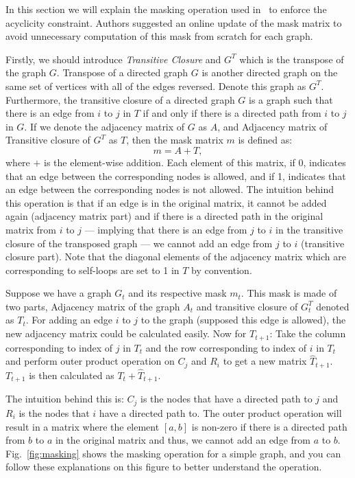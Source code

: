 \documentclass{lxaiproposal}
\begin{document}
    In this section we will explain the masking operation used in~\cite{deleu2022daggflownet} to enforce the acyclicity
    constraint. Authors suggested an online update of the mask matrix to avoid unnecessary computation of this mask
    from scratch for each graph.

    Firstly, we should introduce \textit{Transitive Closure} and $G^T$ which is the transpose of the graph $G$.
    Transpose of a directed graph $G$ is another directed graph on the same set of vertices with all of the edges
    reversed. Denote this graph as $G^T$. Furthermore, the transitive closure of a directed graph $G$ is a graph
    such that there is an edge from $i$ to $j$ in $T$ if and only if there is a directed path from $i$ to $j$ in
    $G$. If we denote the adjacency matrix of $G$ as $A$, and Adjacency matrix of Transitive closure of $G^T$ as $T$,
    then the mask matrix $m$ is defined as:
    \[
        m = A + T,
    \]
    where $+$ is the element-wise addition.
    Each element of this matrix, if 0, indicates that an edge between the corresponding nodes is allowed, and if 1,
    indicates that an edge between the corresponding nodes is not allowed. The intuition behind this operation is
    that if an edge is in the original matrix, it cannot be added again (adjacency matrix part) and if there is a
    directed path in the original matrix from $i$ to $j$ --- implying that there is an edge from $j$ to $i$ in the
    transitive closure of the transposed graph --- we cannot add an edge from $j$ to $i$ (transitive closure part).
    Note that the diagonal elements of the adjacency matrix which are corresponding to self-loops are set to 1 in $T$
    by convention.

    Suppose we have a graph $G_t$ and its respective mask $m_t$. This mask is made of two parts, Adjacency matrix of
    the graph $A_t$ and transitive closure of $G_t^T$ denoted as $T_{t}$. For adding an edge $i$ to $j$ to the
    graph (supposed this edge is allowed), the new adjacency matrix could be calculated easily. Now for $T_{t+1}$:
    Take the column corresponding to index of $j$ in $T_t$ and the row corresponding to index of $i$ in $T_t$ and
    perform outer product operation on $C_j$ and $R_i$ to get a new matrix $\hat{T}_{t+1}$. $T_{t+1}$ is then
    calculated as $T_t + \hat{T}_{t+1}$.

    The intuition behind this is: $C_j$ is the nodes that have a directed path to $j$ and $R_i$ is the nodes that
    $i$ have a directed path to. The outer product operation will result in a matrix where the element $[a, b]$ is
    non-zero if there is a directed path from $b$ to $a$ in the original matrix and thus, we cannot add an edge from
    $a$ to $b$. Fig.~\ref{fig:masking} shows the masking operation for a simple graph, and you can follow these
    explanations on this figure to better understand the operation.
\end{document}
